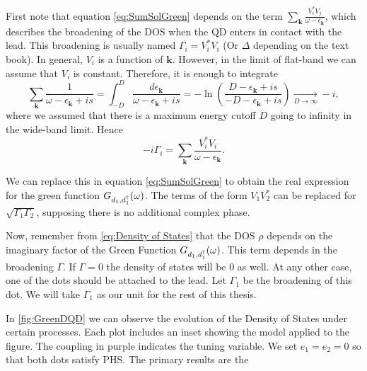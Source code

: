 First note that equation \eqref{eq:SumSolGreen} depends on the term $\sum_{\boldsymbol{k}}\frac{V_{i}^{*}V_{j}}{\omega-\epsilon_{\boldsymbol{k}}}$, which describes the broadening of the DOS when the QD enters in contact with the lead. This broadening is usually named $\Gamma_i=V_{i}^{*}V_{i}$ (Or $\Delta$ depending on the text book). 
In general, $V_i$  is a function of $\textbf{k}$. However, in the limit of flat-band we can assume that $V_i $ is constant. Therefore, it is enough to integrate
\begin{equation}
    \sum_{\boldsymbol{k}}\frac{1}{\omega-\epsilon_{\boldsymbol{k}}+is}=\int_{-D}^{D}\frac{d\epsilon_{\boldsymbol{k}}}{\omega-\epsilon_{\boldsymbol{k}}+is}=-\ln\left(\frac{D-\epsilon_{\boldsymbol{k}}+is}{-D-\epsilon_{\boldsymbol{k}}+is}\right)\xrightarrow[D\rightarrow\infty]{}-i , 
\end{equation}
\noindent where we assumed that there is a maximum  energy cutoff $D$ going to infinity in the wide-band limit. Hence 
\begin{equation}
   -i\Gamma_i = \sum_{\boldsymbol{k}}\frac{V_{i}^{*}V_{i}}{\omega-\epsilon_{\boldsymbol{k}}}.
\end{equation}



We can replace this in equation \eqref{eq:SumSolGreen} to obtain the real expression for the green function $G_{d_1,d_1^\dagger}(\omega)$. The terms of the form $V_1V_2^*$ can be replaced for $\sqrt{\Gamma_1\Gamma_2}$, supposing there is no additional complex phase.

Now, remember from \eqref{eq:Density of States} that the DOS $\rho$ depends on the imaginary factor of the Green Function $G_{d_1,d_1^\dagger}(\omega)$. This term depends in the broadening $\Gamma$. If $\Gamma = 0$ the density of states will be $0$ as well. At any other case, one of the dots should be attached to the lead. Let $\Gamma_1$ be the broadening of this dot. We will take $\Gamma_1$ as our  unit for the rest of this thesis.  

In \ref{fig:GreenDQD} we can observe the evolution of the Density of States under certain processes. Each plot includes an inset showing the model applied to the figure. The coupling in purple indicates the tuning variable. We set $e_1 = e_2 = 0$ so that both dots satisfy PHS. The primary results are the 

